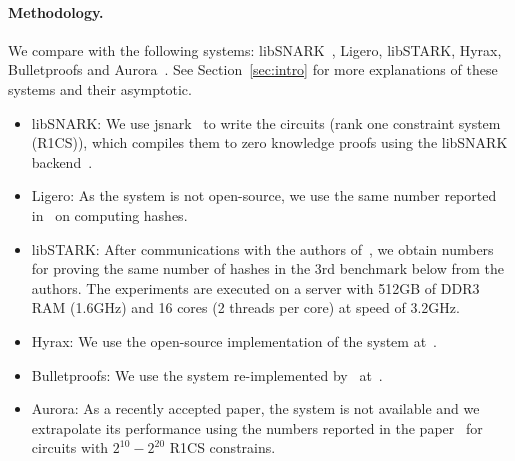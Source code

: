 \paragraph{Methodology.} We compare with the following systems: \textsf{libSNARK}~\cite{libsnark}, \textsf{Ligero}\cite{ligero}, \textsf{libSTARK}\cite{libstark}, \textsf{Hyrax}\cite{hyrax},  \textsf{Bulletproofs}\cite{bulletproofs} and \textsf{Aurora}~\cite{aurora}. See Section~\ref{sec:intro} for more explanations of these systems and their asymptotic. 
\begin{itemize}[leftmargin=*]
\item \textsf{libSNARK:} We use jsnark~\cite{jsnark} to write the circuits (rank one constraint system (R1CS)), which compiles them to zero knowledge proofs using the libSNARK backend~\cite{libsnark_impl}. 

\item\textsf{Ligero:} As the system is not open-source, we use the same number reported in~\cite{ligero} on computing hashes.

\item\textsf{libSTARK:} %
After communications with the authors of~\cite{libstark}, we obtain numbers for proving the same number of hashes in the 3rd benchmark below from the authors. The experiments are executed on a server with 512GB of DDR3 RAM (1.6GHz) and 16 cores (2 threads per core) at speed of 3.2GHz.


\item\textsf{Hyrax:} We use the open-source implementation of the system at~\cite{hyrax_impl}.

\item\textsf{Bulletproofs:} We use the system re-implemented by~\cite{hyrax} at~\cite{hyrax_impl}.


\item\textsf{Aurora:} As a recently accepted paper, the system is not available and we extrapolate its performance using the numbers reported in the paper~\cite{aurora} for circuits with $2^{10}-2^{20}$ R1CS constrains.

\end{itemize}


